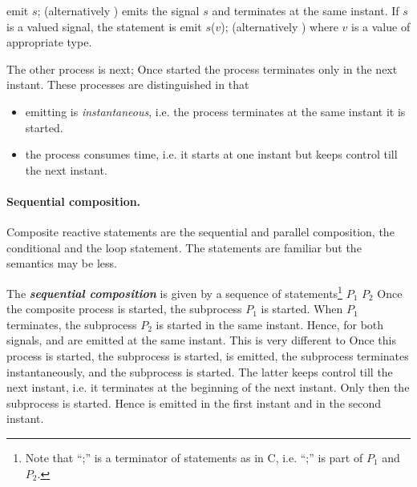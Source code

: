 % 
\BEP
                  emit $s$; 
\EEP
% 
(alternatively ) emits the signal $s$ and terminates at
the same instant.  If $s$ is a valued signal, the statement is
% 
\BEP
                  emit $s$($v$);
\EEP
% 
(alternatively ) where $v$ is a value of appropriate
type.

% 
The other process
 is
% 
\BEP
                  next;
\EEP
% 
Once started the process terminates only in the next instant.  
These processes are distinguished in that
\begin{itemize}
	\item emitting is \emph{instantaneous}, i.e. the process
	terminates at the same instant it is started.

	\item  the process  consumes time, i.e. it starts at 
	one instant but keeps control till the next instant.
\end{itemize}

\paragraph{Sequential composition.}

Composite reactive statements are the sequential and parallel 
composition,
the conditional and the loop statement.  The statements are familiar 
but the semantics may be less.

The \textbf{\emph{sequential composition}} is given by a sequence of 
statements\footnote{Note that ``;'' is a terminator of statements as 
in C, i.e. ``;'' is part of $P_{1}$ and $P_{2}$.}
% 
\BEP
                  $P_{1}$ $P_{2}$
\EEP
% 
Once the composite process is started, the subprocess $P_{1}$ is
started.  When $P_{1}$ terminates, the subprocess $P_{2}$ is started 
in
the same instant.  Hence, for
% 
% 
both signals,  and  are emitted at the same instant. This 
is very different to
% 
% 
Once this process is started, the subprocess  is started,
 is emitted, the subprocess terminates instantaneously, and the
subprocess  is started.  The latter keeps control till the
next instant, i.e. it terminates at the beginning of the next 
instant. 
Only then the subprocess  is started.  Hence  is
emitted in the first instant and  in the second
instant.

